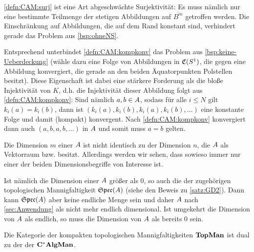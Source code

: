\begin{bem}
\ref{defn:CAM:surj} ist eine Art abgeschwächte Surjektivität: Es muss nämlich nur eine bestimmte Teilmenge der stetigen Abbildungen auf $\overline{B^m}$ getroffen werden. Die Einschränkung auf Abbildungen, die auf dem Rand konstant sind, verhindert gerade das Problem aus \cref{bsp:ohneNS}.

Entsprechend unterbindet \ref{defn:CAM:kompkonv} das Problem aus \cref{bsp:keine-Ueberdeckung} (wähle dazu eine Folge von Abbildungen in $\mathfrak{C}(S^1)$, die gegen eine Abbildung konvergiert, die gerade an den beiden Äquatorpunkten Polstellen besitzt). Diese Eigenschaft ist dabei eine stärkere Forderung als die bloße Injektivität von $K$, d.h. die Injektivität dieser Abbildung folgt aus \ref*{defn:CAM:kompkonv}: Sind nämlich $a,b \in A$, sodass für alle $i \leq N$ gilt $k_i(a) = k_i(b)$, dann ist $(k_i(a), k_i(b), k_i(a), k_i(b), \dots)$ eine konstante Folge und damit (kompakt) konvergent. Nach \ref*{defn:CAM:kompkonv} konvergiert dann auch $(a, b, a, b, \dots)$ in $A$ und somit muss $a = b$ gelten.
\end{bem}

\begin{bem}
Die Dimension $m$ einer \CAlgMan{} $A$ ist nicht identisch zu der Dimension $n$, die $A$ als Vektorraum bzw. \CAlg{} besitzt. Allerdings werden wir sehen, dass sowieso immer nur einer der beiden Dimensionsbegriffe von Interesse ist. 

Ist nämlich die Dimension einer \CAlgMan{} $A$ größer als $0$, so auch die der zugehörigen topologischen Mannigfaltigkeit $\mathfrak{Spec}(A)$ (siehe den Beweis zu \cref{satz:GD2}). Dann kann $\mathfrak{Spec}(A)$ aber keine endliche Menge sein und daher $A$ nach \cref{sec:Anwendung} als \CAlg{} nicht mehr endlich dimensional. Ist umgekehrt die Dimension von $A$ als \CAlg{} endlich, so muss die Dimension von $A$ als \CAlgMan{} bereits $0$ sein.
\end{bem}

\begin{satz}\label{satz:GD2}
Die Kategorie der kompakten topologischen Mannigfaltigkeiten $\mathbf{TopMan}$ ist dual zu der der \CAlgMann{} $\mathbf{C^*AlgMan}$.
\end{satz}

